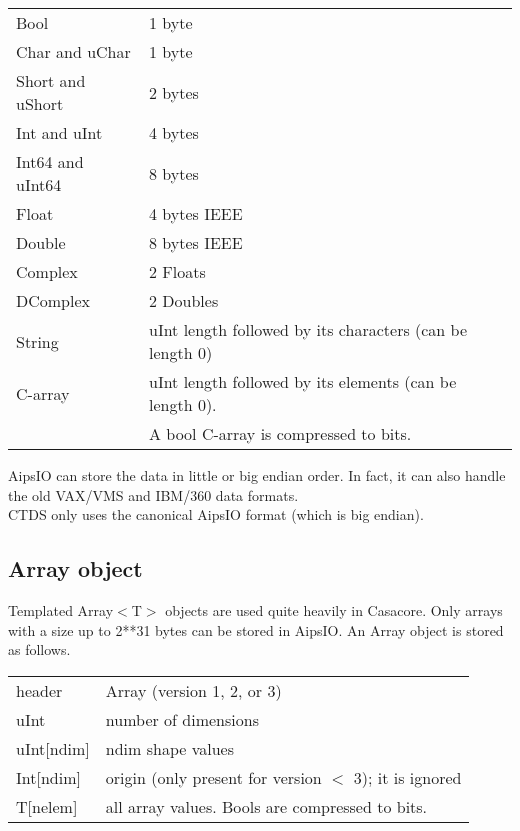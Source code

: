 \vspace{0.15in}
\begin{tabular}{|l|p{12cm}|} \hline
  Bool & 1 byte \\
  Char and uChar & 1 byte \\
  Short and uShort & 2 bytes \\
  Int and uInt & 4 bytes \\
  Int64 and uInt64 & 8 bytes \\
  Float & 4 bytes IEEE \\
  Double & 8 bytes IEEE \\
  Complex & 2 Floats \\
  DComplex & 2 Doubles \\
  String & uInt length followed by its characters (can be length 0) \\
  C-array & uInt length followed by its elements (can be length 0).
  \tabularnewline & A bool C-array is compressed to bits. \\
  \hline
\end{tabular}
\vspace{0.15in}

AipsIO can store the data in little or big endian order. In fact,
it can also handle the old VAX/VMS and IBM/360 data formats.
\\CTDS only uses the canonical AipsIO format (which is big endian).


\subsection{Array object}
Templated Array$<$T$>$ objects are used quite heavily in Casacore.
Only arrays with a size up to 2**31 bytes can be stored in AipsIO.
An Array object is stored as follows.

\vspace{0.15in}
\begin{tabular}{|l|p{13cm}|} \hline
  header & Array (version 1, 2, or 3) \\
  uInt & number of dimensions \\
  uInt[ndim] & ndim shape values \\
  Int[ndim] & origin (only present for version $<$ 3); it is ignored \\
  T[nelem] & all array values. Bools are compressed to bits. \\
  \hline
\end{tabular}
\vspace{0.15in}

